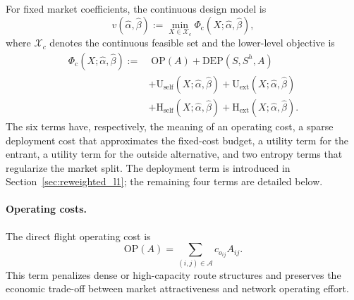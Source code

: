 For fixed market coefficients, the continuous design model is
\begin{equation}
v(\widehat{\alpha},\widehat{\beta}):=
\min_{X\in\mathcal{X}_c}\Phi_{\mathrm{c}}(X;\widehat{\alpha},\widehat{\beta}),
\label{eq:value_function_single_level}
\end{equation}
where $\mathcal{X}_c$ denotes the continuous feasible set and the lower-level objective is
\begin{align}
\Phi_{\mathrm{c}}(X;\widehat{\alpha},\widehat{\beta})
:=&\;
\mathrm{OP}(A)
+\mathrm{DEP}(S,S^h,A)
\nonumber\\
&+\mathrm{U}_{\mathrm{self}}(X;\widehat{\alpha},\widehat{\beta})
+\mathrm{U}_{\mathrm{ext}}(X;\widehat{\alpha},\widehat{\beta})
\nonumber\\
&+\mathrm{H}_{\mathrm{self}}(X;\widehat{\alpha},\widehat{\beta})
+\mathrm{H}_{\mathrm{ext}}(X;\widehat{\alpha},\widehat{\beta}).
\label{eq:continuous_objective}
\end{align}
The six terms have, respectively, the meaning of an operating cost, a sparse deployment cost that approximates the fixed-cost budget, a utility term for the entrant, a utility term for the outside alternative, and two entropy terms that regularize the market split. The deployment term is introduced in Section~\ref{sec:reweighted_l1}; the remaining four terms are detailed below.

\paragraph{Operating costs.}
The direct flight operating cost is
\begin{equation}
\mathrm{OP}(A)=\sum_{(i,j)\in\mathcal{A}} c_{o_{ij}}A_{ij}.
\label{eq:continuous_operating_cost}
\end{equation}
This term penalizes dense or high-capacity route structures and preserves the economic trade-off between market attractiveness and network operating effort.

